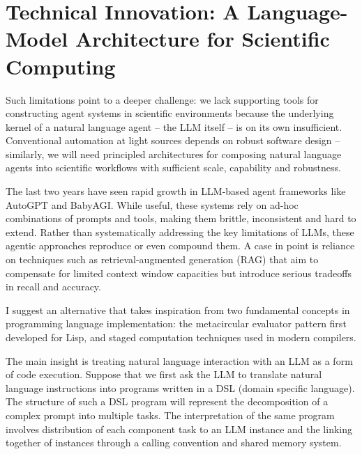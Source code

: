 \documentclass{article}
\begin{document}
\section{Technical Innovation: A Language-Model Architecture for Scientific Computing}
Such limitations point to a deeper challenge: we lack supporting tools for constructing agent systems in scientific environments because the underlying kernel of a natural language agent -- the LLM itself -- is on its own insufficient. Conventional automation at light sources depends on robust software design --  similarly, we will need principled architectures for composing natural language agents into scientific workflows with sufficient scale, capability and robustness.


The last two years have seen rapid growth in LLM-based agent frameworks like AutoGPT and BabyAGI. While useful, these systems rely on ad-hoc combinations of prompts and tools, making them brittle, inconsistent and hard to extend. Rather than systematically addressing the key limitations of LLMs, these agentic approaches reproduce or even compound them. A case in point is reliance on techniques such as retrieval-augmented generation (RAG) that aim to compensate for limited context window capacities but introduce serious tradeoffs in recall and accuracy.

I suggest an alternative that takes inspiration from two fundamental concepts in programming language implementation: the metacircular evaluator pattern first developed for Lisp, and staged computation techniques used in modern compilers.

The main insight is treating natural language interaction with an LLM as a form of code execution. Suppose that we first ask the LLM to translate natural language instructions into programs written in a DSL (domain specific language). The structure of such a DSL program will represent the decomposition of a complex prompt into multiple tasks. The interpretation of the same program involves distribution of each component task to an LLM instance and the linking together of instances through a calling convention and shared memory system.
\end{document}
